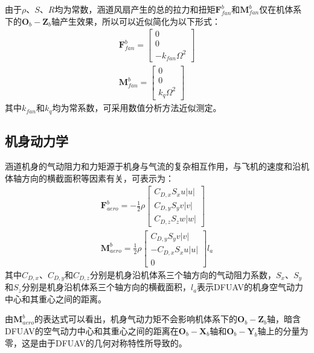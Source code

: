 由于$\rho$、$S$、$R$均为常数，涵道风扇产生的总的拉力和扭矩$\boldsymbol{F}_{fan}^b$和$\boldsymbol{M}_{fan}^b$仅在机体系下的${\boldsymbol{O}_b}-{\boldsymbol{Z}_b}$轴产生效果，所以可以近似简化为以下形式\cite{choiStaticAnalysisSmall2012,manzoorCompositeObserverbasedRobust2023}：
\begin{align}
            \boldsymbol{F}_{fan}^b=\begin{bmatrix}0 \\ 0 \\
                -k_{fan}\Omega^2
            \end{bmatrix}    \label{eq_21.5}\\
            \boldsymbol{M}_{fan}^b=\begin{bmatrix}0 \\ 0 \\
            k_{q}\Omega^2
            \end{bmatrix}    \label{eq_22}
\end{align}
其中$k_{fan}$和$k_{q}$均为常系数，可采用数值分析方法近似测定。
\subsection{机身动力学}

涵道机身的气动阻力和力矩源于机身与气流的复杂相互作用，与飞机的速度和沿机体轴方向的横截面积等因素有关，可表示为\cite{johnsonModelingControlFlight2006b,choiStaticAnalysisSmall2012}：
\begin{gather}
    \boldsymbol{F}_{aero}^b=-\frac{1}{2}\rho
    \begin{bmatrix}
    C_{D,x}S_xu|u| \\
    C_{D,y}S_yv|v| \\
    C_{D,z}S_zw|w|
    \end{bmatrix}\label{eq_22.5}\\
    \boldsymbol{M}_{aero}^b=\frac{1}{2}\rho
    \begin{bmatrix}
    C_{D,y}S_yv|v| \\
    -C_{D,x}S_xu|u| \\
    0
    \end{bmatrix}l_{a}
    \label{eq_23}
\end{gather}
其中$C_{D,x}$、$C_{D,y}$和$C_{D,z}$分别是机身沿机体系三个轴方向的气动阻力系数，$S_x$、$S_y$和$S_z$分别是机身沿机体系三个轴方向的横截面积，$l_{a}$表示DFUAV的机身空气动力中心和其重心之间的距离。

由$\boldsymbol{M}_{aero}^b$的表达式可以看出，机身气动力矩不会影响机体系下的${\boldsymbol{O}_b}-{\boldsymbol{Z}_b}$轴，暗含DFUAV的空气动力中心和其重心之间的距离在${\boldsymbol{O}_b}-{\boldsymbol{X}_b}$轴和${\boldsymbol{O}_b}-{\boldsymbol{Y}_b}$轴上的分量为零，这是由于DFUAV的几何对称特性所导致的。

